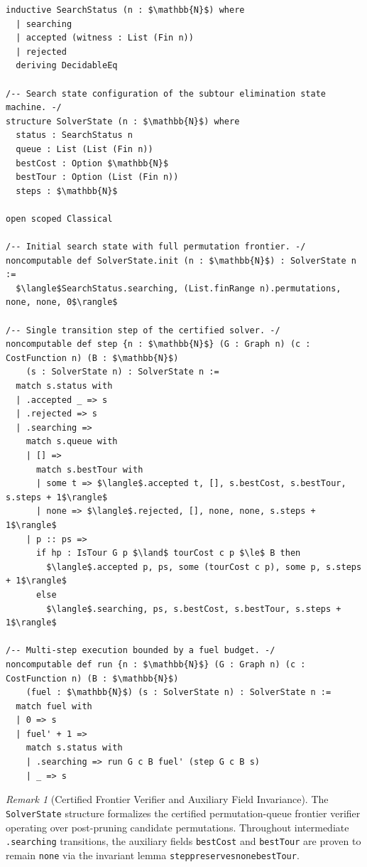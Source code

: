\documentclass[11pt,a4paper]{article}
\renewcommand{\_}{\origunderscore\allowbreak}
\theoremstyle{plain}
\theoremstyle{definition}
\theoremstyle{remark}
\newtheorem{remark}[theorem]{Remark}
\begin{document}
\begin{lstlisting}[language=lean4]
inductive SearchStatus (n : $\mathbb{N}$) where
  | searching
  | accepted (witness : List (Fin n))
  | rejected
  deriving DecidableEq

/-- Search state configuration of the subtour elimination state machine. -/
structure SolverState (n : $\mathbb{N}$) where
  status : SearchStatus n
  queue : List (List (Fin n))
  bestCost : Option $\mathbb{N}$
  bestTour : Option (List (Fin n))
  steps : $\mathbb{N}$

open scoped Classical

/-- Initial search state with full permutation frontier. -/
noncomputable def SolverState.init (n : $\mathbb{N}$) : SolverState n :=
  $\langle$SearchStatus.searching, (List.finRange n).permutations, none, none, 0$\rangle$

/-- Single transition step of the certified solver. -/
noncomputable def step {n : $\mathbb{N}$} (G : Graph n) (c : CostFunction n) (B : $\mathbb{N}$)
    (s : SolverState n) : SolverState n :=
  match s.status with
  | .accepted _ => s
  | .rejected => s
  | .searching =>
    match s.queue with
    | [] =>
      match s.bestTour with
      | some t => $\langle$.accepted t, [], s.bestCost, s.bestTour, s.steps + 1$\rangle$
      | none => $\langle$.rejected, [], none, none, s.steps + 1$\rangle$
    | p :: ps =>
      if hp : IsTour G p $\land$ tourCost c p $\le$ B then
        $\langle$.accepted p, ps, some (tourCost c p), some p, s.steps + 1$\rangle$
      else
        $\langle$.searching, ps, s.bestCost, s.bestTour, s.steps + 1$\rangle$

/-- Multi-step execution bounded by a fuel budget. -/
noncomputable def run {n : $\mathbb{N}$} (G : Graph n) (c : CostFunction n) (B : $\mathbb{N}$)
    (fuel : $\mathbb{N}$) (s : SolverState n) : SolverState n :=
  match fuel with
  | 0 => s
  | fuel' + 1 =>
    match s.status with
    | .searching => run G c B fuel' (step G c B s)
    | _ => s
\end{lstlisting}

\begin{remark}[Certified Frontier Verifier and Auxiliary Field Invariance]
The \texttt{SolverState} structure formalizes the certified permutation-queue frontier verifier operating over post-pruning candidate permutations. Throughout intermediate \texttt{.searching} transitions, the auxiliary fields \texttt{bestCost} and \texttt{bestTour} are proven to remain \texttt{none} via the invariant lemma \texttt{step\_preserves\_none\_bestTour}.
\end{remark}
\end{document}
